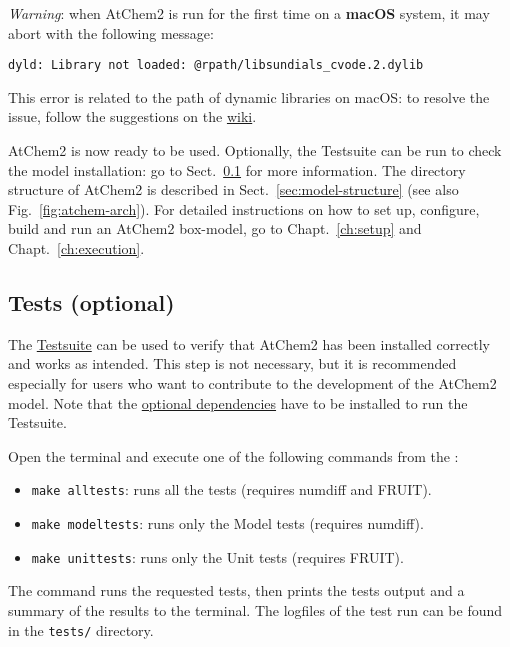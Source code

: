 \emph{Warning}: when AtChem2 is run for the first time on a
\textbf{macOS} system, it may abort with the following message:

\begin{verbatim}
dyld: Library not loaded: @rpath/libsundials_cvode.2.dylib
\end{verbatim}

This error is related to the path of dynamic libraries on macOS:
to resolve the issue, follow the suggestions on the
\href{https://github.com/AtChem/AtChem2/wiki/Known-Issues}{wiki}.

AtChem2 is now ready to be used. Optionally, the Testsuite can be run
to check the model installation: go to Sect.~\ref{subsec:tests-optional}
for more information. The directory structure of AtChem2 is described
in Sect.~\ref{sec:model-structure} (see also Fig.~\ref{fig:atchem-arch}).
For detailed instructions on how to set up, configure, build and
run an AtChem2 box-model, go to Chapt.~\ref{ch:setup} and
Chapt.~\ref{ch:execution}.

\subsection{Tests (optional)} \label{subsec:tests-optional}

The \hyperref[sec:test-suite]{Testsuite} can be used to verify that
AtChem2 has been installed correctly and works as intended. This step
is not necessary, but it is recommended especially for users who want
to contribute to the development of the AtChem2 model. Note that the
\hyperref[subsec:optional-dependencies]{optional dependencies} have to
be installed to run the Testsuite.

Open the terminal and execute one of the following commands from the
\maindir:

\begin{itemize}
\item \verb|make alltests|: runs all the tests (requires numdiff and FRUIT).
\item \verb|make modeltests|: runs only the Model tests (requires numdiff).
\item \verb|make unittests|: runs only the Unit tests (requires FRUIT).
\end{itemize}

The command runs the requested tests, then prints the tests output and
a summary of the results to the terminal. The logfiles of the test run
can be found in the \texttt{tests/} directory.

